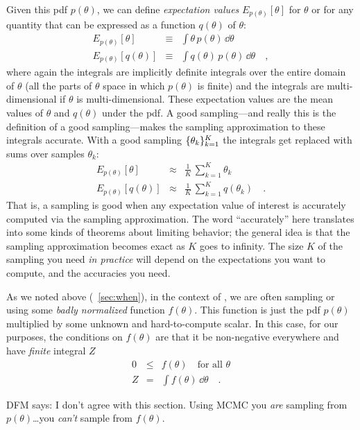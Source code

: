 \documentclass[12pt,twoside,pdftex]{article}
\newcommand{\MCMC}{\acronym{MCMC}}
\newcommand{\pars}{\theta}
\begin{document}
Given this pdf $p(\pars)$, we can define \emph{expectation values}
$E_{p(\pars)}[\pars]$
for $\pars$ or for any quantity that can be expressed as a function $q(\pars)$
of $\pars$:
\begin{eqnarray}
E_{p(\pars)}[\pars] &\equiv& \int \pars\,p(\pars)\,\dd \pars
\\
E_{p(\pars)}[q(\pars)] &\equiv& \int q(\pars)\,p(\pars)\,\dd \pars
\quad ,
\end{eqnarray}
where again the integrals are implicitly definite integrals over the
entire domain
of $\pars$ (all the parts of $\pars$ space in which $p(\pars)$ is finite) and the
integrals are multi-dimensional if $\pars$ is multi-dimensional.
These expectation values are the mean values of $\pars$ and $q(\pars)$ under
the pdf.  A good sampling---and really this is the definition of a good
sampling---makes the sampling approximation to these integrals
accurate.
With a good sampling $\setof{\pars_k}_{k=1}^K$ the integrals get replaced
with sums over samples $\pars_k$:
\begin{eqnarray}
E_{p(\pars)}[\pars] &\approx& \frac{1}{K}\,\sum_{k=1}^K \pars_k
\\
E_{p(\pars)}[q(\pars)] &\approx& \frac{1}{K}\,\sum_{k=1}^K q(\pars_k)
\quad .
\end{eqnarray}
That is, a sampling is good when any expectation value of interest is
accurately computed via the sampling approximation.
The word ``accurately'' here translates into some kinds of theorems
about limiting behavior; the general idea is that the sampling
approximation becomes exact as $K$ goes to infinity.
The size $K$ of the sampling you need \emph{in practice} will depend
on the expectations you want to compute, and the accuracies you need.

As we noted above (\sectionname~\ref{sec:when}), in the context of \MCMC, we are often sampling or
using some \emph{badly normalized} function $f(\pars)$.
This function is just the pdf $p(\pars)$ multiplied by some unknown and
hard-to-compute scalar.
In this case, for our purposes, the conditions on $f(\pars)$ are that it
be non-negative everywhere and have \emph{finite} integral $Z$
\begin{eqnarray}
0 &\leq& f(\pars) \quad \mbox{for all $\pars$}
\\
Z &=& \int f(\pars)\,\dd \pars \label{eq:proper}
\quad .
\end{eqnarray}

DFM says: I don't agree with this section. Using MCMC you \emph{are} sampling
from $p(\pars)$\ldots you \emph{can't} sample from $f(\pars)$.
\end{document}
